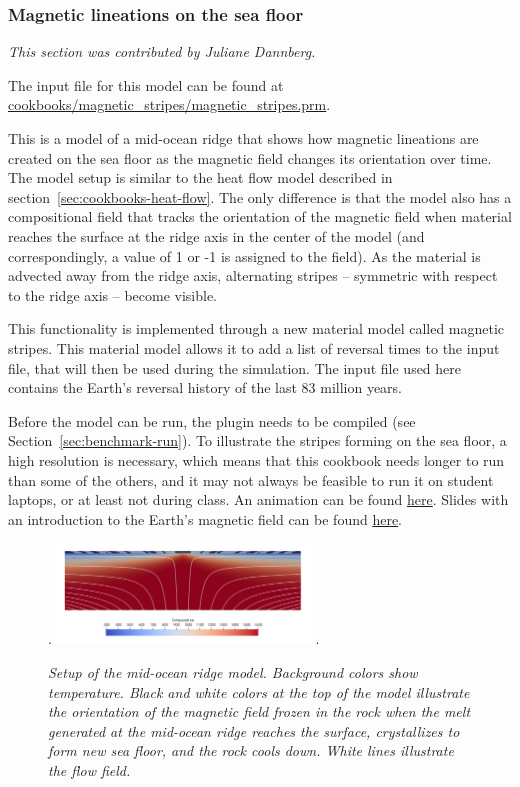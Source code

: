 \subsubsection{Magnetic lineations on the sea floor}
\label{sec:cookbooks-magnetic-stripes}
\textit{This section was contributed by Juliane Dannberg.}

The input file for this model can be found at \url{cookbooks/magnetic_stripes/magnetic_stripes.prm}.

This is a model of a mid-ocean ridge that shows how magnetic lineations 
are created on the sea floor as the magnetic field changes its orientation over time.
The model setup is similar to the heat flow model described in section~\ref{sec:cookbooks-heat-flow}. 
The only difference is that the model also has a compositional field that tracks the orientation of the
magnetic field when material reaches the surface at the ridge axis in the center of the model 
(and correspondingly, a value of 1 or -1 is assigned to the field). As the material is advected 
away from the ridge axis, alternating stripes -- symmetric with respect to the ridge axis -- become visible. 

This functionality is implemented through a new material model called magnetic stripes. 
This material model allows it to add a list of reversal times to the input file, that will then be used during the 
simulation. The input file used here contains the Earth's reversal history of the last 83 million years. 

Before the model can be run, the plugin needs to be compiled (see Section~\ref{sec:benchmark-run}). 
To illustrate the stripes forming on the sea floor, a high resolution is necessary, which means that this
cookbook needs longer to run than some of the others, and it may not always be feasible to run it on student laptops, 
or at least not during class. An animation can be found \href{https://www.youtube.com/watch?v=KeHNhWLL7ws}{here}.
Slides with an introduction to the Earth's magnetic field can be found \href{https://www.dropbox.com/s/2kkw3ce2muvn4nh/08_geophysics_lecture_02_05.pdf?dl=0}{here}.

\begin{figure}[h]
\phantom.
\hfill
\includegraphics[width=0.6\textwidth]{cookbooks/magnetic_stripes/doc/mid-ocean-ridge.png}
\hfill
\phantom.
\caption{\it Setup of the mid-ocean ridge model. Background colors show temperature. Black and white colors at the top of the model illustrate the orientation of the magnetic field frozen in the rock when the melt generated at the mid-ocean ridge reaches the surface, crystallizes to form new sea floor, and the rock cools down. White lines illustrate the flow field.}
\label{fig:convection-box-iterations}
\end{figure}





